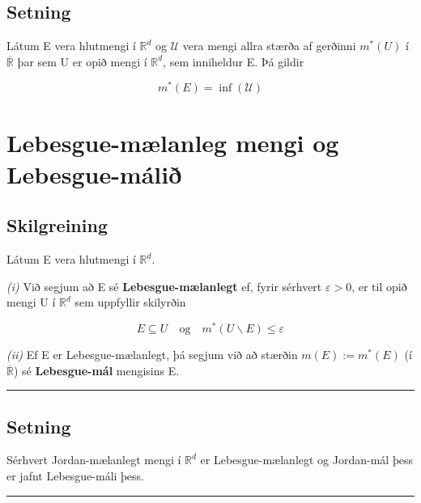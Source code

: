 \documentclass[]{book}
\begin{document}
\hypertarget{setning-23}{%
\section{Setning}\label{setning-23}}

Látum E vera hlutmengi í \(\mathbb R^d\) og \(\mathcal U\) vera mengi allra stærða af gerðinni \(m^*(U)\) í \(\overline{\mathbb R}\) þar sem U er opið mengi í \(\mathbb R^d\), sem inniheldur E. Þá gildir

\[
m^*(E) = \inf(\mathcal U)
\]

\hypertarget{lebesgue-mlanleg-mengi-og-lebesgue-mali}{%
\chapter{Lebesgue-mælanleg mengi og Lebesgue-málið}\label{lebesgue-mlanleg-mengi-og-lebesgue-mali}}

\hypertarget{skilgreining-6}{%
\section{Skilgreining}\label{skilgreining-6}}

Látum E vera hlutmengi í \(\mathbb R^d\).

\emph{(i)} Við segjum að E sé \textbf{Lebesgue-mælanlegt} ef, fyrir sérhvert \(\varepsilon > 0\), er til opið mengi U í \(\mathbb R^d\) sem uppfyllir skilyrðin

\[
E\subseteq U \quad \text{og} \quad m^*(U\backslash E) \leq \varepsilon
\]

\emph{(ii)} Ef E er Lebesgue-mælanlegt, þá segjum við að stærðin \(m(E) := m^*(E)\) (í \(\overline{\mathbb R}\)) sé \textbf{Lebesgue-mál} mengisins E.

\begin{center}\rule{0.5\linewidth}{\linethickness}\end{center}

\hypertarget{setning-24}{%
\section{Setning}\label{setning-24}}

Sérhvert Jordan-mælanlegt mengi í \(\mathbb R^d\) er Lebesgue-mælanlegt og Jordan-mál þess er jafnt Lebesgue-máli þess.

\begin{center}\rule{0.5\linewidth}{\linethickness}\end{center}
\end{document}

